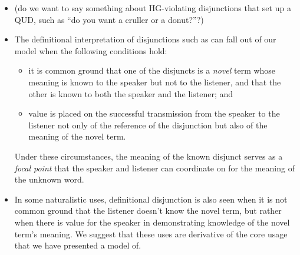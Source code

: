 \documentclass[12pt]{article}
\begin{document}
\begin{itemize}
\item (do we want to say something about HG-violating disjunctions
  that set up a QUD, such as ``do you want a cruller or a donut?''?)

\item The definitional interpretation of disjunctions such as can fall
  out of our model when the following conditions hold:
%
  \begin{itemize}
  \item it is common ground that one of the disjuncts is a
    \emph{novel} term whose meaning is known to the speaker but not to
    the listener, and that the other is known to both the speaker and
    the listener; and
\item  value is placed on the successful transmission from the speaker
  to the listener not only of the reference of the disjunction but
  also of the meaning of the novel term.
\end{itemize}
%
Under these circumstances, the meaning of the known disjunct serves as a
\emph{focal point} that the speaker and listener can coordinate on for
the meaning of the unknown word.

\item In some naturalistic uses, definitional disjunction is also seen when
  it is not common ground that the listener doesn't know the novel
  term, but rather when there is value for the speaker in
  demonstrating knowledge of the novel term's meaning.  We suggest
  that these uses are derivative of the core usage that we have
  presented a model of.

\end{itemize}
\renewcommand{\bibsection}{\paragraph{References}}


\end{document}
